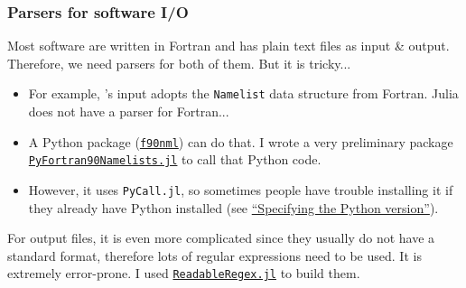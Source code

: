 \subsubsection{Parsers for \ab{} software I/O}

\begin{frame}[allowframebreaks]{\subsubsecname}
    Most \ab{} software are written in Fortran and has plain text files as input \& output.
    Therefore, we need parsers for both of them. But it is tricky...

        {\footnotesize
            \begin{itemize}
                \item For example, \qe{}'s input adopts the \texttt{Namelist} data structure from
                      Fortran. Julia does not have a parser for Fortran...
                \item A Python package
                      (\href{https://github.com/marshallward/f90nml}{\texttt{f90nml}}) can do that.
                      I wrote a very preliminary package
                      \href{https://github.com/singularitti/PyFortran90Namelists.jl}{\texttt{PyFortran90Namelists.jl}}
                      to call that Python code.
                \item However, it uses \texttt{PyCall.jl}, so sometimes people have trouble installing
                      it if they already have Python installed
                      (see \href{https://github.com/JuliaPy/PyCall.jl\#specifying-the-python-version}{``Specifying the Python version''}).
            \end{itemize}
        }

    For output files, it is even more complicated since they usually do not have a standard
    format, therefore lots of regular expressions need to be used.
    It is extremely error-prone. I used
    \href{https://github.com/jkrumbiegel/ReadableRegex.jl}{\texttt{ReadableRegex.jl}} to build them.
\end{frame}
